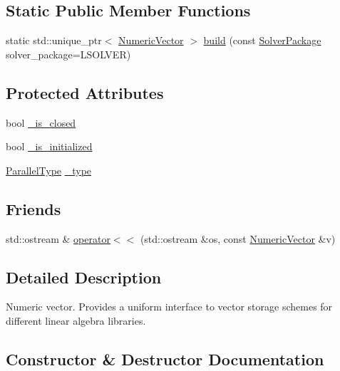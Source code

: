 \subsection*{Static Public Member Functions}
\begin{DoxyCompactItemize}
\item 
static std\+::unique\+\_\+ptr$<$ \mbox{\hyperlink{classfemus_1_1_numeric_vector}{Numeric\+Vector}} $>$ \mbox{\hyperlink{classfemus_1_1_numeric_vector_aa554690df717f373d2b51e564fc421d6}{build}} (const \mbox{\hyperlink{_solver_package_enum_8hpp_a32541e934c944770722653e69abe38fe}{Solver\+Package}} solver\+\_\+package=L\+S\+O\+L\+V\+ER)
\end{DoxyCompactItemize}
\subsection*{Protected Attributes}
\begin{DoxyCompactItemize}
\item 
bool \mbox{\hyperlink{classfemus_1_1_numeric_vector_a722d2654319ad192949d9f844975e80e}{\+\_\+is\+\_\+closed}}
\item 
bool \mbox{\hyperlink{classfemus_1_1_numeric_vector_a1c0db787810e7c4b7d385da57081790a}{\+\_\+is\+\_\+initialized}}
\item 
\mbox{\hyperlink{_paralleltype_enum_8hpp_a55f694af2ca20b6481914237cf7e567c}{Parallel\+Type}} \mbox{\hyperlink{classfemus_1_1_numeric_vector_a40eebd0755df82e691bea575694f1100}{\+\_\+type}}
\end{DoxyCompactItemize}
\subsection*{Friends}
\begin{DoxyCompactItemize}
\item 
std\+::ostream \& \mbox{\hyperlink{classfemus_1_1_numeric_vector_a078efc50da3b1d6143d03599e47e1777}{operator$<$$<$}} (std\+::ostream \&os, const \mbox{\hyperlink{classfemus_1_1_numeric_vector}{Numeric\+Vector}} \&v)
\end{DoxyCompactItemize}


\subsection{Detailed Description}
Numeric vector. Provides a uniform interface to vector storage schemes for different linear algebra libraries. 

\subsection{Constructor \& Destructor Documentation}
\mbox{\label{classfemus_1_1_numeric_vector_a09f0db3964796d3984fad98c1ba4a556}} 
